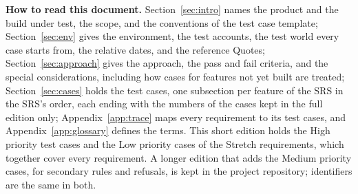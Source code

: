 \noindent\textbf{How to read this document.} Section~\ref{sec:intro} names the product and the build under test, the scope, and the conventions of the test case template; Section~\ref{sec:env} gives the environment, the test accounts, the test world every case starts from, the relative dates, and the reference Quotes; Section~\ref{sec:approach} gives the approach, the pass and fail criteria, and the special considerations, including how cases for features not yet built are treated; Section~\ref{sec:cases} holds the test cases, one subsection per feature of the SRS in the SRS's order, each ending with the numbers of the cases kept in the full edition only; Appendix~\ref{app:trace} maps every requirement to its test cases, and Appendix~\ref{app:glossary} defines the terms. This short edition holds the High priority test cases and the Low priority cases of the Stretch requirements, which together cover every requirement. A longer edition that adds the Medium priority cases, for secondary rules and refusals, is kept in the project repository; identifiers are the same in both.

\tableofcontents
\clearpage
